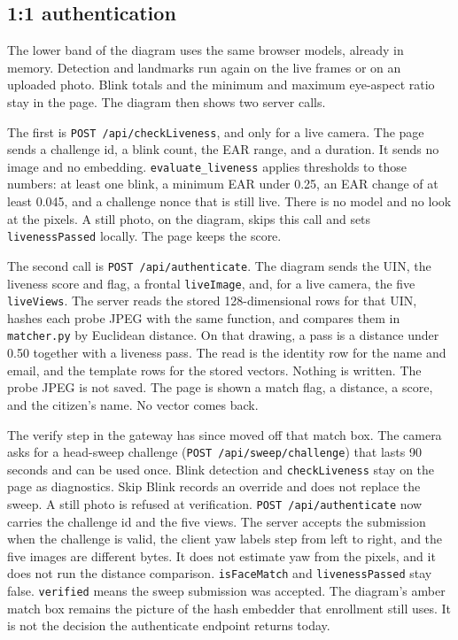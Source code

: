 \documentclass[11pt]{article}
\begin{document}
\subsection{1:1 authentication}

The lower band of the diagram uses the same browser models, already in memory. Detection and landmarks run again on the live frames or on an uploaded photo. Blink totals and the minimum and maximum eye-aspect ratio stay in the page. The diagram then shows two server calls.

The first is \texttt{POST /api/checkLiveness}, and only for a live camera. The page sends a challenge id, a blink count, the EAR range, and a duration. It sends no image and no embedding. \texttt{evaluate\_liveness} applies thresholds to those numbers: at least one blink, a minimum EAR under 0.25, an EAR change of at least 0.045, and a challenge nonce that is still live. There is no model and no look at the pixels. A still photo, on the diagram, skips this call and sets \texttt{livenessPassed} locally. The page keeps the score.

The second call is \texttt{POST /api/authenticate}. The diagram sends the UIN, the liveness score and flag, a frontal \texttt{liveImage}, and, for a live camera, the five \texttt{liveViews}. The server reads the stored 128-dimensional rows for that UIN, hashes each probe JPEG with the same function, and compares them in \texttt{matcher.py} by Euclidean distance. On that drawing, a pass is a distance under 0.50 together with a liveness pass. The read is the identity row for the name and email, and the template rows for the stored vectors. Nothing is written. The probe JPEG is not saved. The page is shown a match flag, a distance, a score, and the citizen's name. No vector comes back.

The verify step in the gateway has since moved off that match box. The camera asks for a head-sweep challenge (\texttt{POST /api/sweep/challenge}) that lasts 90 seconds and can be used once. Blink detection and \texttt{checkLiveness} stay on the page as diagnostics. Skip Blink records an override and does not replace the sweep. A still photo is refused at verification. \texttt{POST /api/authenticate} now carries the challenge id and the five views. The server accepts the submission when the challenge is valid, the client yaw labels step from left to right, and the five images are different bytes. It does not estimate yaw from the pixels, and it does not run the distance comparison. \texttt{isFaceMatch} and \texttt{livenessPassed} stay false. \texttt{verified} means the sweep submission was accepted. The diagram's amber match box remains the picture of the hash embedder that enrollment still uses. It is not the decision the authenticate endpoint returns today.
\end{document}
